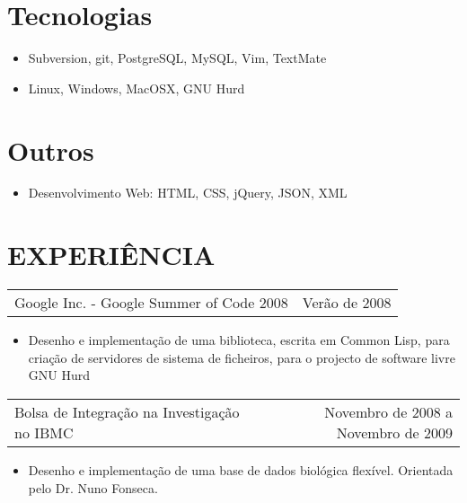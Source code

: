 \documentclass[margin]{res}
\begin{document}
\begin{resume}
\normalsize{\section{Tecnologias}} 
                 \begin{itemize}
                  \item Subversion, git, PostgreSQL, MySQL, Vim, TextMate
                  \item Linux, Windows, MacOSX, GNU Hurd
                  \end{itemize}
                  
\normalsize{\section{Outros}} 
              \begin{itemize}
                \item Desenvolvimento Web: HTML, CSS, jQuery, JSON, XML
              \end{itemize}

\section{EXPERIÊNCIA}
            
                  \begin{tabular}{p{3in} r}
                  Google Inc. - Google Summer of Code 2008 & Verão de 2008
                  \end{tabular}	
                   \begin{itemize} %
                    \item[]  Desenho e implementação de uma biblioteca, escrita em Common Lisp, para criação de servidores
                     de sistema de ficheiros, para o projecto de software livre GNU Hurd 
		   \end{itemize} 
		   
		 \begin{tabular}{p{3in} r}
                  Bolsa de Integração na Investigação no IBMC &  Novembro de 2008 a Novembro de 2009 
                 \end{tabular}
		  \begin{itemize}
                   \item[] Desenho e implementação de uma base de dados biológica flexível. Orientada pelo Dr. Nuno Fonseca.
                  \end{itemize}
                  

\end{resume}
\end{document}
